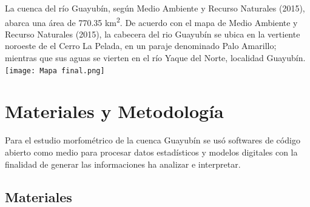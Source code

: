 \documentclass[11pt,]{article}
\begin{document}
La cuenca del río Guayubín, según Medio Ambiente y Recurso Naturales
(2015), abarca una área de 770.35 km\textsuperscript{2}. De acuerdo con
el mapa de Medio Ambiente y Recurso Naturales (2015), la cabecera del
rio Guayubín se ubica en la vertiente noroeste de el Cerro La Pelada, en
un paraje denominado Palo Amarillo; mientras que sus aguas se vierten en
el río Yaque del Norte, localidad Guayubín.
\texttt{[image: Mapa final.png]}

\section{Materiales y Metodología}\label{materiales-y-metodologuxeda}

Para el estudio morfométrico de la cuenca Guayubín se usó softwares de
código abierto como medio para procesar datos estadísticos y modelos
digitales con la finalidad de generar las informaciones ha analizar e
interpretar.

\subsection{Materiales}\label{materiales}
\end{document}
